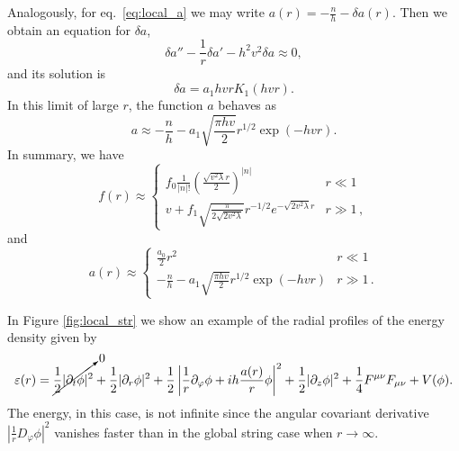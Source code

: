 Analogously, for eq.\ \eqref{eq:local_a} we may write $a(r) = -\frac{n}{h} - \delta a(r)$. Then we obtain an equation for $\delta a$,
\begin{equation}
	\delta a'' - \frac{1}{r}\delta a' - h^2v^2 \delta a \approx 0,
\end{equation}
and its solution is 
\begin{equation}
	\delta a = a_1 hvr K_1(hv r).
\end{equation}
In this limit of large $r$, the function $a$ behaves as
\begin{equation}
	a \approx -\frac{n}{h} - a_1\sqrt{\frac{\pi h v}{2}} r^{1/2} \exp\left(-hv r \right).
\end{equation}
In summary, we have
\begin{equation}
	\label{eq:fapproxsol}
	f(r) \approx \begin{cases}
		\displaystyle f_0 \frac{1}{|n|!}\left(\frac{\sqrt{v^2 \lambda}r}{2}\right)^{|n|}& r \ll 1 \\
	\displaystyle v+f_1\sqrt{\frac{\pi}{2\sqrt{2v^2\lambda}}}r^{-1/2}e^{-\sqrt{2v^2\lambda}r} & r \gg 1\, ,
				\end{cases}
\end{equation}
and
\begin{equation}
\label{eq:a_asymp}
	a(r) \approx \begin{cases}
		\displaystyle \frac{a_0}{2} r^2& r \ll 1 \\
	\displaystyle -\frac{n}{h} - a_1\sqrt{\frac{\pi h v}{2}} r^{1/2} \exp\left(-hv r \right) & r \gg 1\, .
				\end{cases}
\end{equation}

In Figure \ref{fig:local_str} we show an example of the radial profiles of the energy density given by
 \begin{equation}
	\label{eq:energy_density}
	\varepsilon(r) = \cancelto{0}{\frac{1}{2}|\partial_t \phi|^2} +\frac{1}{2}|\partial_r \phi|^2 + \frac{1}{2}\left|\frac{1}{r}\partial_{\varphi} \phi+ih\frac{a(r)}{r}\phi \right|^2 +\frac{1}{2}|\partial_z \phi|^2 +\frac{1}{4}F^{\mu\nu}F_{\mu\nu}  + V(\phi).
\end{equation}
The energy, in this case, is not infinite since the angular covariant derivative $|\frac{1}{r}D_{\varphi}\phi|^2$ vanishes faster than in the global string case when $r\to\infty$. 


